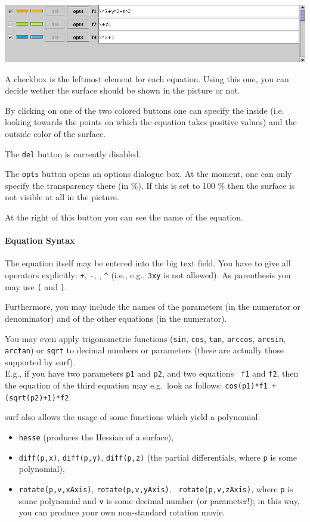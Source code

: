 \documentclass{article}
\begin{document}
\ \\\includegraphics[scale=0.35]{surfex_equations}

A checkbox is the leftmost element for each equation. 
Using this one, you can decide wether the surface should be shown in the
picture or not. 

By clicking on one of the two colored buttons one can specify the inside (i.e.
looking towards the points on which the equation takes positive values) and
the outside color of the surface. 

The {\tt del} button is currently disabled. 

The {\tt opts} button opens an options dialogue box. 
At the moment, one can only specify the transparency there (in \%). 
If this is set to 100 \% then the surface is not visible at all in the
picture. 

At the right of this button you can see the name of the equation. 

\paragraph{Equation Syntax}

The equation itself may be entered into the big text field. 
You have to give all operators explicitly: {\tt +}, {\tt -}, {\tt *},
{\tt \^{}} (i.e., e.g., {\tt 3xy} is not allowed). 
As parenthesis you may use {\tt (} and {\tt )}.

Furthermore, you may include the names of the parameters (in the numerator or
denominator) and of the other equations (in the numerator). 

You may even apply trigonometric functions ({\tt sin}, {\tt cos}, {\tt tan},
{\tt arccos}, {\tt arcsin}, {\tt arctan}) or {\tt sqrt} to decimal numbers or
parameters (these are actually those supported by {\sc surf}).\\
E.g., if you have two parameters {\tt p1} and {\tt p2}, and two equations {\tt
  f1} and {\tt f2}, then the equation of the third equation may e.g.\ look as
follows: {\tt cos(p1)*f1 + (sqrt(p2)+1)*f2}.

{\sc surf} also allows the usage of some functions which yield a polynomial:
\begin{itemize}
\item {\tt hesse} (produces the Hessian of a surface), 
\item
  {\tt diff(p,x)}, {\tt diff(p,y)}, {\tt diff(p,z)} (the partial
  differentials, where {\tt p} is some polynomial),  
\item {\tt rotate(p,v,xAxis)}, {\tt rotate(p,v,yAxis)}, {\tt
  rotate(p,v,zAxis)}, where {\tt p} is some polynomial and {\tt v} is 
  some decimal number (or parameter!); in this way, you can produce your own
  non-standard rotation movie.
\end{itemize}
\end{document}
